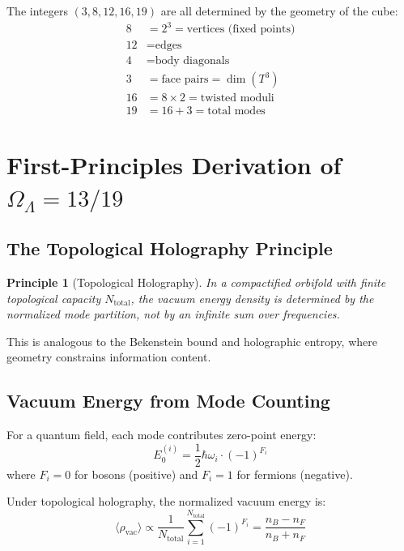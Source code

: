 \documentclass[12pt,a4paper]{article}
\newtheorem{principle}[theorem]{Principle}
\newcommand{\Tthree}{T^3}
\newcommand{\OmegaL}{\Omega_\Lambda}
\newcommand{\nB}{n_B}
\newcommand{\nF}{n_F}
\newcommand{\Ntot}{N_{\text{total}}}
\begin{document}
The integers $(3, 8, 12, 16, 19)$ are all determined by the geometry of the cube:
\begin{align}
8 &= 2^3 = \text{vertices (fixed points)} \\
12 &= \text{edges} \\
4 &= \text{body diagonals} \\
3 &= \text{face pairs} = \dim(\Tthree) \\
16 &= 8 \times 2 = \text{twisted moduli} \\
19 &= 16 + 3 = \text{total modes}
\end{align}

\section{First-Principles Derivation of $\OmegaL = 13/19$}
\label{sec:derivation}

\subsection{The Topological Holography Principle}

\begin{principle}[Topological Holography]
\label{prin:holography}
In a compactified orbifold with finite topological capacity $\Ntot$, the vacuum energy density is determined by the normalized mode partition, not by an infinite sum over frequencies.
\end{principle}

This is analogous to the Bekenstein bound and holographic entropy, where geometry constrains information content.

\subsection{Vacuum Energy from Mode Counting}

For a quantum field, each mode contributes zero-point energy:
\begin{equation}
E_0^{(i)} = \frac{1}{2}\hbar\omega_i \cdot (-1)^{F_i}
\end{equation}
where $F_i = 0$ for bosons (positive) and $F_i = 1$ for fermions (negative).

Under topological holography, the normalized vacuum energy is:
\begin{equation}
\langle\rho_{\text{vac}}\rangle \propto \frac{1}{\Ntot} \sum_{i=1}^{\Ntot} (-1)^{F_i} = \frac{\nB - \nF}{\nB + \nF}
\end{equation}
\end{document}
